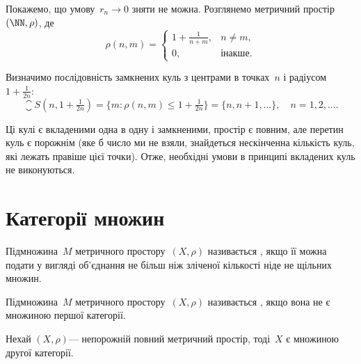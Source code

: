 \begin{remark}
Покажемо, що умову~$r_n \to 0$ зняти не
можна. Розглянемо метричний простір~$(\NN, \rho)$, де
\begin{equation*}
    \rho(n, m) = \begin{cases}
        1 + \frac{1}{n + m}, & n \ne m, \\
        0, & \text{інакше}.
    \end{cases}
\end{equation*}

Визначимо послідовність замкнених куль з центрами в
точках~$n$ і радіусом~$1 + \frac{1}{2 n}$:
\begin{equation*}
    \closure S (n, 1 + \tfrac{1}{2n}) =
    \{ m: \rho(n, m) \le 1 + \tfrac{1}{2n} \} =
    \{n, n + 1, \dots\}, \quad n = 1, 2, \dots.
\end{equation*}

Ці кулі є вкладеними одна в одну і замкненими, простір є
повним, але перетин куль є порожнім (яке б число ми не
взяли, знайдеться нескінченна кількість куль, які лежать
правіше цієї точки). Отже, необхідні умови в принципі
вкладених куль не виконуються.
\end{remark}

\section{Категорії множин}

\begin{definition}
Підмножина~$M$ метричного простору~$(X, \rho)$
називається , якщо її
можна подати у вигляді об’єднання не більш ніж зліченої
кількості ніде не щільних множин.
\end{definition}

\begin{definition}
Підмножина~$M$ метричного простору~$(X, \rho)$
називається , якщо вона не є
множиною першої категорії.
\end{definition}

\begin{theorem}
 Нехай
$(X, \rho)$--- непорожній повний метричний простір, тоді~$X$
є множиною другої категорії.
\end{theorem}

